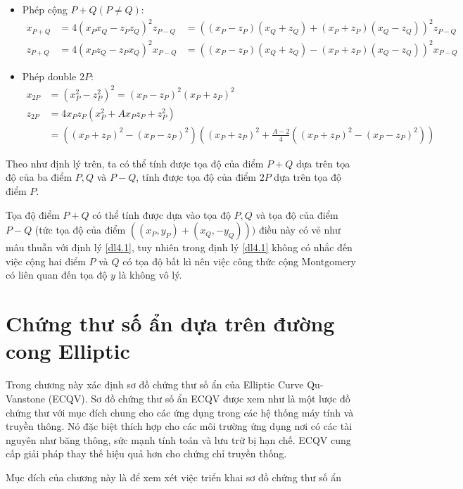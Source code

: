 \documentclass[a4paper,12pt]{report}
\begin{document}
\begin{itemize}
\item[] Phép cộng $P + Q (P \neq Q)$:
\begin{displaymath}
\begin{aligned}
x_{P+Q} & = 4(x_P x_Q - z_Pz_Q)^2z_{P-Q} & = ((x_P - z_P)(x_Q + z_Q) + (x_P + z_P)(x_Q - z_Q))^2z_{P-Q} \\
z_{P+Q} & = 4(x_Pz_Q - z_Px_Q)^2x_{P-Q} & = ((x_P - z_P)(x_Q + z_Q) - (x_P + z_P)(x_Q - z_Q))^2x_{P-Q}
\end{aligned}
\end{displaymath}
\item[] Phép double $2P$:
\begin{displaymath}
\begin{aligned}
x_{2P} & = (x^2_P - z^2_P)^2  = (x_P - z_P)^2(x_P + z_P)^2 \\
z_{2P} & = 4x_Pz_P(x^2_P + Ax_Pz_P + z^2_P) \\ & = ((x_P + z_P)^2 - (x_P - z_P)^2)\left((x_P + z_P)^2 + \frac{A - 2}{4}((x_P + z_P)^2 - (x_P - z_P)^2) \right)
\end{aligned}
\end{displaymath}
\end{itemize}

Theo như định lý trên, ta có thể tính được tọa độ của điểm $P + Q$ dựa trên tọa độ của ba điểm $P, Q$ và $P-Q$, tính được tọa độ của điểm $2P$ dựa trên tọa độ điểm $P$.

Tọa độ điểm $P+Q$ có thể tính được dựa vào tọa độ $P, Q$ và tọa độ của điểm $P-Q$ (tức tọa độ của điểm $((x_P, y_P) + (x_Q, -y_Q)))$ điều này có vẻ như mâu thuẫn với định lý \ref{dl4.1}, tuy nhiên trong định lý \ref{dl4.1} không có nhắc đến việc cộng hai điểm $P$ và $Q$ có tọa độ bất kì nên việc công thức cộng Montgomery có liên quan đến tọa độ $y$ là không vô lý.
\chapter{Chứng thư số ẩn dựa trên đường cong Elliptic}
Trong chương này xác định sơ đồ chứng thư số ẩn của Elliptic Curve Qu-Vanstone (ECQV). Sơ đồ chứng thư số ẩn ECQV được xem như là một lược đồ chứng thư với mục đích chung cho các ứng dụng trong các hệ thống máy tính và truyền thông. Nó đặc biệt thích hợp cho các môi trường ứng dụng nơi có các tài nguyên như băng thông, sức mạnh tính toán và lưu trữ bị hạn chế. ECQV cung cấp giải pháp thay thế hiệu quả hơn cho chứng chỉ truyền thống.

Mục đích của chương này là để xem xét việc triển khai sơ đồ chứng thư số ẩn 
\end{document}
